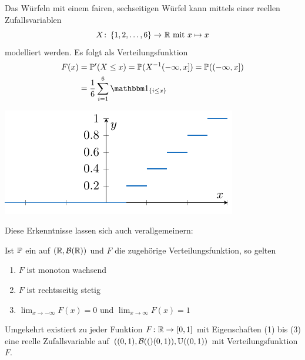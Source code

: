 \begin{beispiel}
    Das Würfeln mit einem fairen, sechseitigen Würfel kann mittels einer reellen Zufallsvariablen
    \begin{equation*}
        \abb{X}{\menge{1,2,\dots, 6}}{\R} \mit x \mapsto x
    \end{equation*}
    modelliert werden. Es folgt als Verteilungsfunktion
    \begin{equation*}
    \begin{aligned}
    F(x) &= \P'(X \leq x) = \P(X^{-1}(-\infty,x]) = \P((-\infty,x]) \\
         &= \frac{1}{6}\sum_{i=1}^{6} \one_{\menge{i \leq x}}
    \end{aligned}
    \end{equation*}
\end{beispiel}

\begin{center}
    \includegraphics{./stoch_abbildungen/wuerfel_verteilungsfunktion.pdf}
\end{center}

Diese Erkenntnisse lassen sich auch verallgemeinern:

\begin{satz}
    Ist $\P$ ein \WMass auf $(\R, \borel\R)$ und $F$ die zugehörige Verteilungsfunktion, so gelten
    \begin{enumerate}[nolistsep, topsep=-\parskip]
        \item $F$ ist monoton wachsend
        \item $F$ ist rechtsseitig stetig
        \item $\lim_{x\to -\infty} F(x) = 0$ und $\lim_{x\to \infty} F(x) = 1$
    \end{enumerate}
    Umgekehrt existiert zu jeder Funktion $\abb{F}{\R}{[0,1]}$ mit Eigenschaften (1) bis (3) eine reelle Zufallsvariable auf $((0,1), \borel((0,1)), \Uni((0,1))$ mit Verteilungsfunktion $F$.
\end{satz}

